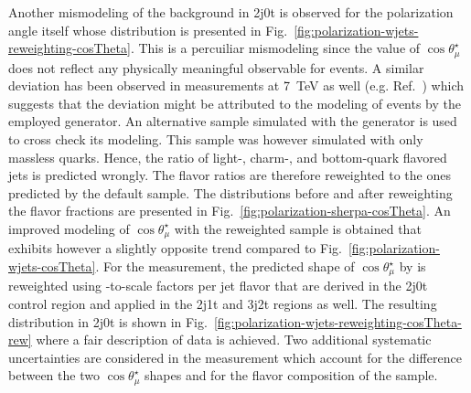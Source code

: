 Another mismodeling of the \wjets background in 2j0t is observed for the polarization angle itself whose distribution is presented in Fig.~\ref{fig:polarization-wjets-reweighting-cosTheta}. This is a percuiliar mismodeling since the value of $\cos\theta_\mu^\star$ does not reflect any physically meaningful observable for \wjets events. A similar deviation has been observed in measurements at 7~TeV as well (e.g. Ref.~\cite{Komm-thesis}) which suggests that the deviation might be attributed to the modeling of \wjets events by the employed \MG generator. An alternative \wjets sample simulated with the \SHERPA generator is used to cross check its modeling. This sample was however simulated with only massless quarks. Hence, the ratio of light-, charm-, and bottom-quark flavored jets is predicted wrongly. The flavor ratios are therefore reweighted to the ones predicted by the default \MG sample. The distributions before and after reweighting the flavor fractions are presented in Fig.~\ref{fig:polarization-sherpa-cosTheta}. An improved modeling of $\cos\theta_{\mu}^\star$ with the reweighted \SHERPA sample is obtained that exhibits however a slightly opposite trend compared to Fig.~\ref{fig:polarization-wjets-cosTheta}. For the measurement, the predicted shape of $\cos\theta_{\mu}^\star$ by \MG is reweighted using \MG-to-\SHERPA scale factors per jet flavor that are derived in the 2j0t control region and applied in the 2j1t and 3j2t regions as well. The resulting distribution in 2j0t is shown in Fig.~\ref{fig:polarization-wjets-reweighting-cosTheta-rew} where a fair description of data is achieved. Two additional systematic uncertainties are considered in the measurement which account for the difference between the two $\cos\theta_\mu^\star$ shapes and for the flavor composition of the \wjets sample.



